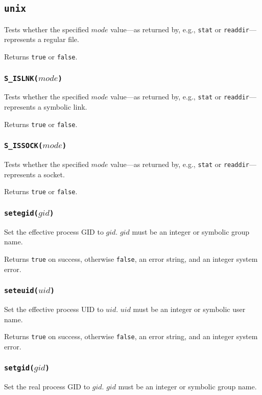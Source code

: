 \documentclass[11pt, oneside]{memoir}
\newcommand*{\true}[0]{\texttt{true}\xspace}
\newcommand*{\false}[0]{\texttt{false}\xspace}
\newcommand*{\syscall}[1]{\texttt{#1}\xspace}
\newcommand*{\fn}[1]{\texttt{#1}\xspace}
\newcounter{toccols}
\newenvironment{Module}[1]{
	\subsection{\texttt{#1}}
	\addtocontents{toc}{
		\protect\begin{multicols}{\value{toccols}}
	}
}{
	\addtocontents{toc}{\protect\end{multicols}}
}
\begin{document}
\begin{Module}{unix}
Tests whether the specified $mode$ value---as returned by, e.g., \syscall{stat} or \syscall{readdir}---represents a regular file.

Returns \true or \false.

\subsubsection[\fn{S\_ISLNK}]{\fn{S\_ISLNK($mode$)}}

Tests whether the specified $mode$ value---as returned by, e.g., \syscall{stat} or \syscall{readdir}---represents a symbolic link.

Returns \true or \false.

\subsubsection[\fn{S\_ISSOCK}]{\fn{S\_ISSOCK($mode$)}}

Tests whether the specified $mode$ value---as returned by, e.g., \syscall{stat} or \syscall{readdir}---represents a socket.

Returns \true or \false.

\subsubsection[\fn{setegid}]{\fn{setegid($gid$)}}

Set the effective process GID to $gid$. $gid$ must be an integer or symbolic group name.

Returns \true on success, otherwise \false, an error string, and an integer system error.

\subsubsection[\fn{seteuid}]{\fn{seteuid($uid$)}}

Set the effective process UID to $uid$. $uid$ must be an integer or symbolic user name.

Returns \true on success, otherwise \false, an error string, and an integer system error.

\subsubsection[\fn{setgid}]{\fn{setgid($gid$)}}

Set the real process GID to $gid$. $gid$ must be an integer or symbolic group name.


\end{Module}
\end{document}
